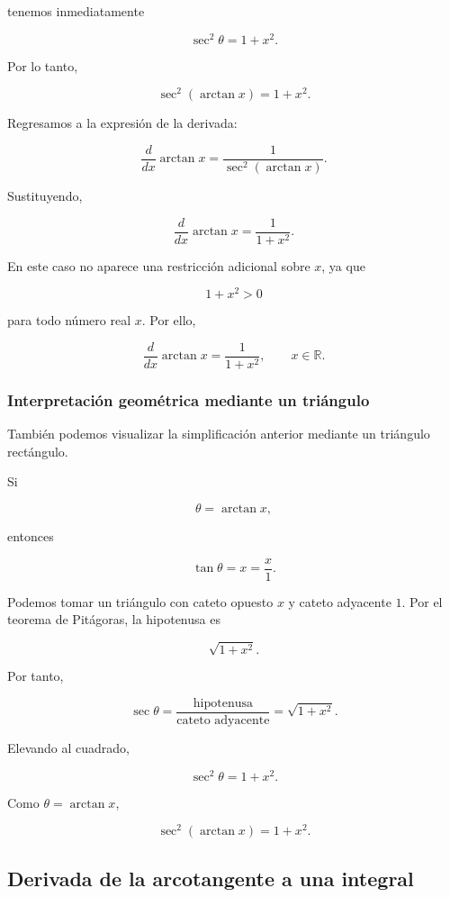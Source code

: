 \documentclass[12pt]{article}
\theoremstyle{definition}
\theoremstyle{remark}
\begin{document}
tenemos inmediatamente

\[
\sec^2\theta
=
1+x^2.
\]

Por lo tanto,

\[
\boxed{
\sec^2(\arctan x)
=
1+x^2.
}
\]

Regresamos a la expresión de la derivada:

\[
\frac{d}{dx}\arctan x
=
\frac{1}{\sec^2(\arctan x)}.
\]

Sustituyendo,

\[
\boxed{
\frac{d}{dx}\arctan x
=
\frac{1}{1+x^2}.
}
\]

En este caso no aparece una restricción adicional sobre $x$, ya que

\[
1+x^2>0
\]

para todo número real $x$. Por ello,

\[
\boxed{
\frac{d}{dx}\arctan x
=
\frac{1}{1+x^2},
\qquad x\in\mathbb{R}.
}
\]

\subsubsection*{Interpretación geométrica mediante un triángulo}

También podemos visualizar la simplificación anterior mediante un
triángulo rectángulo.

Si

\[
\theta=\arctan x,
\]

entonces

\[
\tan\theta=x=\frac{x}{1}.
\]

Podemos tomar un triángulo con cateto opuesto $x$ y cateto adyacente
$1$. Por el teorema de Pitágoras, la hipotenusa es

\[
\sqrt{1+x^2}.
\]

Por tanto,

\[
\sec\theta
=
\frac{\text{hipotenusa}}
     {\text{cateto adyacente}}
=
\sqrt{1+x^2}.
\]

Elevando al cuadrado,

\[
\sec^2\theta=1+x^2.
\]

Como $\theta=\arctan x$,

\[
\sec^2(\arctan x)=1+x^2.
\]

\subsection*{Derivada de la arcotangente a una integral}
\end{document}
